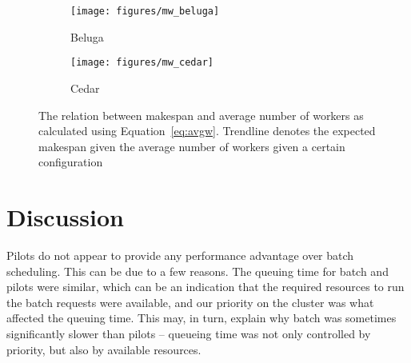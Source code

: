 \documentclass{IEEEtran}
\begin{document}
    \begin{figure*}
        \centering
        \begin{subfigure}[b]{0.475\textwidth}
            \centering
            \texttt{[image: figures/mw\_beluga]}
            \caption[]%
            {{\small Beluga}}
            \label{fig:mwbeluga}
        \end{subfigure}
        \hfill
        \begin{subfigure}[b]{0.475\textwidth}
            \centering
            \texttt{[image: figures/mw\_cedar]}
            \caption[]%
            {{\small Cedar}}
            \label{fig:mwcedar}
        \end{subfigure}
        \caption[]
        {\small The relation between makespan and average number of workers as 
        calculated using Equation~\ref{eq:avgw}. Trendline denotes the expected makespan
        given the average number of workers given a certain configuration}
        \label{fig:mwall}
    \end{figure*}

\section{Discussion}\label{sec:discussion}


Pilots do not appear to provide any performance advantage over batch scheduling.
This can be due to a few reasons. The queuing time for batch and pilots were similar, 
which can be an indication that the required resources to run the batch requests were
available, and our priority on the cluster was what affected the queuing time. This may, in turn,
explain why batch was sometimes significantly slower than pilots -- queueing time was not
only controlled by priority, but also by available resources.
\end{document}
